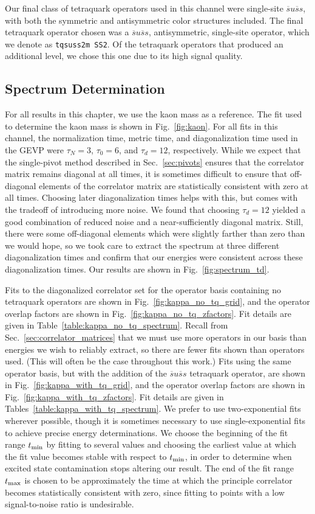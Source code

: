 Our final class of tetraquark operators used in this channel were single-site $\overline s u \overline s s$, with both the symmetric and antisymmetric color structures included. The final tetraquark operator chosen was a $\overline s u \overline s s$, antisymmetric, single-site operator, which we denote as \verb+tqsuss2m SS2+. Of the tetraquark operators that produced an additional level, we chose this one due to its high signal quality.
\subsection{Spectrum Determination}
For all results in this chapter, we use the kaon mass as a reference. The fit used to determine the kaon mass is shown in Fig.~\ref{fig:kaon}. For all fits in this channel, the normalization time, metric time, and diagonalization time used in the GEVP were $\tau_N=3$, $\tau_0=6$, and $\tau_d=12$, respectively. While we expect that the single-pivot method described in Sec.~\ref{sec:pivots} ensures that the correlator matrix remains diagonal at all times, it is sometimes difficult to ensure that off-diagonal elements of the correlator matrix are statistically consistent with zero at all times. Choosing later diagonalization times helps with this, but comes with the tradeoff of introducing more noise. We found that choosing $\tau_d=12$ yielded a good combination of reduced noise and a near-sufficiently diagonal matrix. Still, there were some off-diagonal elements which were slightly farther than zero than we would hope, so we took care to extract the spectrum at three different diagonalization times and confirm that our energies were consistent across these diagonalization times. Our results are shown in Fig.~\ref{fig:spectrum_td}.

Fits to the diagonalized correlator set for the operator basis containing no tetraquark operators are shown in Fig.~\ref{fig:kappa_no_tq_grid}, and the operator overlap factors are shown in Fig.~\ref{fig:kappa_no_tq_zfactors}. Fit details are given in Table~\ref{table:kappa_no_tq_spectrum}. Recall from Sec.~\ref{sec:correlator_matrices} that we must use more operators in our basis than energies we wish to reliably extract, so there are fewer fits shown than operators used. (This will often be the case throughout this work.) Fits using the same operator basis, but with the addition of the $\overline s u \overline s s$ tetraquark operator, are shown in Fig.~\ref{fig:kappa_with_tq_grid}, and the operator overlap factors are shown in Fig.~\ref{fig:kappa_with_tq_zfactors}. Fit details are given in Tables~\ref{table:kappa_with_tq_spectrum}. We prefer to use two-exponential fits wherever possible, though it is sometimes necessary to use single-exponential fits to achieve precise energy determinations. We choose the beginning of the fit range $t_{\rm{min}}$ by fitting to several values and choosing the earliest value at which the fit value becomes stable with respect to $t_{\rm{min}}$, in order to determine when excited state contamination stops altering our result. The end of the fit range $t_{\rm{max}}$ is chosen to be approximately the time at which the principle correlator becomes statistically consistent with zero, since fitting to points with a low signal-to-noise ratio is undesirable.

